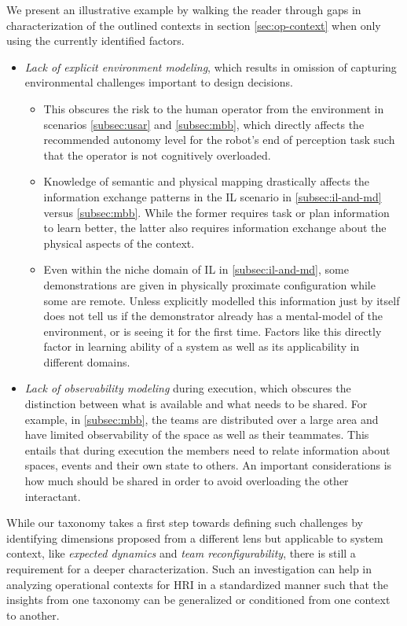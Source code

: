 \documentclass[letterpaper, 10 pt, conference]{ieeeconf}  %
\theoremstyle{definition}
\begin{document}
We present an illustrative example by walking the reader through gaps in characterization of the outlined contexts in section \ref{sec:op-context} when only using the currently identified factors.
\begin{itemize}
    \item \textit{Lack of explicit environment modeling}, which results in omission of capturing environmental challenges important to design decisions.
    \begin{itemize}
        \item This obscures the risk to the human operator from the environment in scenarios \ref{subsec:usar} and \ref{subsec:mbb}, which directly affects the recommended autonomy level for the robot's end of perception task such that the operator is not cognitively overloaded.
        \item Knowledge of semantic and physical mapping drastically affects the information exchange patterns in the IL scenario in \ref{subsec:il-and-md} versus \ref{subsec:mbb}.
        While the former requires task or plan information to learn better, the latter also requires information exchange about the physical aspects of the context.
        \item Even within the niche domain of IL in \ref{subsec:il-and-md}, some demonstrations are given in physically proximate configuration while some are remote.
        Unless explicitly modelled this information just by itself does not tell us if the demonstrator already has a mental-model of the environment, or is seeing it for the first time.
        Factors like this directly factor in learning ability of a system as well as its applicability in different domains.
    \end{itemize}
    \item \textit{Lack of observability modeling} during execution, which obscures the distinction between what is available and what needs to be shared. For example, in \ref{subsec:mbb}, the teams are distributed over a large area and have limited observability of the space as well as their teammates.
    This entails that during execution the members need to relate information about spaces, events and their own state to others.
    An important considerations is how much should be shared in order to avoid overloading the other interactant.
\end{itemize}

While our taxonomy takes a first step towards defining such challenges by identifying dimensions proposed from a different lens but applicable to system context, like \textit{expected dynamics} and \textit{team reconfigurability}, there is still a requirement for a deeper characterization.
Such an investigation can help in analyzing operational contexts for HRI in a standardized manner such that the insights from one taxonomy can be generalized or conditioned from one context to another.
\end{document}
